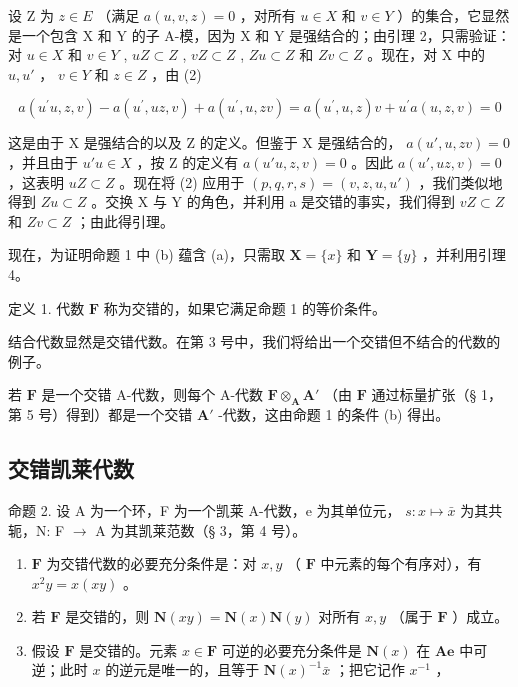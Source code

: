 设 Z 为 \(z \in E\) （满足 \(a(u, v, z) = 0\) ，对所有 \(u \in X\) 和 \(v \in Y\) ）的集合，它显然是一个包含 X 和 Y 的子 A-模，因为 X 和 Y 是强结合的；由引理 2，只需验证：对 \(u \in X\) 和 \(v \in Y\) , \(uZ \subset Z\) , \(vZ \subset Z\) , \(Zu \subset Z\) 和 \(Zv \subset Z\) 。现在，对 X 中的 \(u, u'\) ， \(v \in Y\) 和 \(z \in Z\) ，由 (2)

\[
a (u ^ {\prime} u, z, v) - a (u ^ {\prime}, u z, v) + a (u ^ {\prime}, u, z v) = a (u ^ {\prime}, u, z) v + u ^ {\prime} a (u, z, v) = 0
\]

这是由于 X 是强结合的以及 Z 的定义。但鉴于 X 是强结合的， \(a(u', u, zv) = 0\) ，并且由于 \(u'u \in X\) ，按 Z 的定义有 \(a(u'u, z, v) = 0\) 。因此 \(a(u', uz, v) = 0\) ，这表明 \(uZ \subset Z\) 。现在将 (2) 应用于 \((p, q, r, s) = (v, z, u, u')\) ，我们类似地得到 \(Zu \subset Z\) 。交换 X 与 Y 的角色，并利用 a 是交错的事实，我们得到 \(vZ \subset Z\) 和 \(Zv \subset Z\) ；由此得引理。

现在，为证明命题 1 中 (b) 蕴含 (a)，只需取 \(\mathbf{X} = \{x\}\) 和 \(\mathbf{Y} = \{y\}\) ，并利用引理 4。

定义 1. 代数 \(\mathbf{F}\) 称为交错的，如果它满足命题 1 的等价条件。

结合代数显然是交错代数。在第 3 号中，我们将给出一个交错但不结合的代数的例子。

若 \(\mathbf{F}\) 是一个交错 A-代数，则每个 A-代数 \(\mathbf{F} \otimes_{\mathbf{A}} \mathbf{A}'\) （由 \(\mathbf{F}\) 通过标量扩张（§ 1，第 5 号）得到）都是一个交错 \(\mathbf{A}'\) -代数，这由命题 1 的条件 (b) 得出。

\subsection{交错凯莱代数}

命题 2. 设 A 为一个环，F 为一个凯莱 A-代数，e 为其单位元， \(s: x \mapsto \bar{x}\) 为其共轭，N: F \(\to\) A 为其凯莱范数（§ 3，第 4 号）。

\begin{enumerate}
\def\labelenumi{(\roman{enumi})}
\item
  \(\mathbf{F}\) 为交错代数的必要充分条件是：对 \(x, y\) （ \(\mathbf{F}\) 中元素的每个有序对），有 \(x^2y = x(xy)\) 。
\item
  若 \(\mathbf{F}\) 是交错的，则 \(\mathbf{N}(xy) = \mathbf{N}(x)\mathbf{N}(y)\) 对所有 \(x,y\) （属于 \(\mathbf{F}\) ）成立。
\item
  假设 \(\mathbf{F}\) 是交错的。元素 \(x \in \mathbf{F}\) 可逆的必要充分条件是 \(\mathbf{N}(x)\) 在 \(\mathbf{Ae}\) 中可逆；此时 \(x\) 的逆元是唯一的，且等于 \(\mathbf{N}(x)^{-1}\bar{x}\) ；把它记作 \(x^{-1}\) ，
\end{enumerate}

